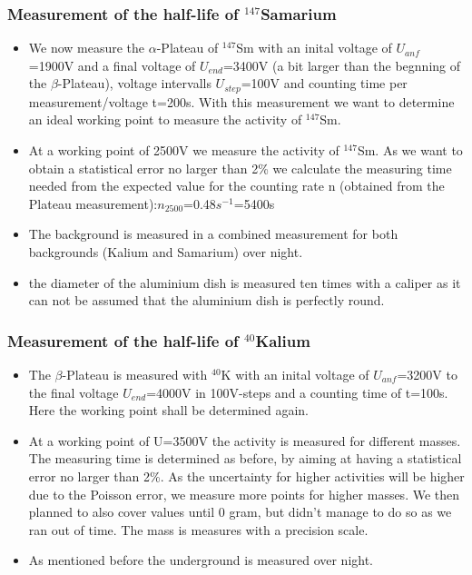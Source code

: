 \documentclass[12pt]{article}
\begin{document}
\subsubsection{Measurement of the half-life of ${}^{147}$Samarium}\label{durchfuehrungsamarium}

\begin{itemize}
	
	\item We now measure the $\alpha$-Plateau of ${}^{147}$Sm with an inital voltage of $U_{anf}$=1900V and a final voltage of $U_{end}$=3400V (a bit larger than the begnning of the $\beta$-Plateau), voltage intervalls $U_{step}$=100V and counting time per measurement/voltage t=200s. With this measurement we want to determine an ideal working point to measure the activity of ${}^{147}$Sm.
	
	\item At a working point of 2500V we measure the activity of ${}^{147}$Sm.
      As we want to obtain a statistical error no larger than 2\% we calculate the measuring time needed from the expected value for the counting rate n (obtained from the Plateau measurement):$n_{2500}$=0.48$s^{-1}$=5400s
      
    \item The background is measured in a combined measurement for both backgrounds (Kalium and Samarium) over night.
    
    \item the diameter of the aluminium dish is measured ten times with a caliper as it can not be assumed that the aluminium dish is perfectly round. 

\end{itemize}

\subsubsection{Measurement of the half-life of ${}^{40}$Kalium}
\label{kaliumdurchfuehrung}

\begin{itemize}
	\item The $\beta$-Plateau is measured with ${}^{40}$K with an inital voltage of $U_{anf}$=3200V to the final voltage $U_{end}$=4000V in 100V-steps and a counting time of t=100s. Here the working point shall be determined again.
	
	\item At a working point of U=3500V  the activity is measured for different masses. The measuring time is determined as before, by aiming at having a statistical error no larger than 2\%. As the uncertainty for higher activities will be higher due to the Poisson error, we measure more points for higher masses. We then planned to also cover values until 0 gram, but didn't manage to do so as we ran out of time. The mass is measures with a precision scale.
	
	\item As mentioned before the underground is measured over night.
	
\end{itemize}
\end{document}
